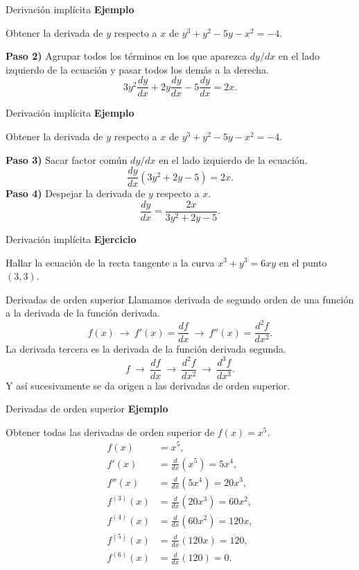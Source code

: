 \documentclass[main.tex]{subfiles}
\begin{document}
\begin{frame}{Derivación implícita}
\textbf{Ejemplo}\par Obtener la derivada de $y$ respecto a $x$ de $y^3+y^2-5y-x^2=-4$.\medskip

\textbf{Paso 2)} Agrupar todos los términos en los que aparezca $dy/dx$ en el lado izquierdo de la ecuación y pasar todos los demás a la derecha.
\[3y^2\frac{dy}{dx}+2y\frac{dy}{dx}-5\frac{dy}{dx}=2x.\]
\end{frame}
\begin{frame}{Derivación implícita}
\textbf{Ejemplo}\par Obtener la derivada de $y$ respecto a $x$ de $y^3+y^2-5y-x^2=-4$.\medskip

\textbf{Paso 3)} Sacar factor común $dy/dx$ en el lado izquierdo de la ecuación.
\[\frac{dy}{dx}(3y^2+2y-5)=2x.\]
\textbf{Paso 4)} Despejar la derivada de $y$ respecto a $x$.
\[\frac{dy}{dx}=\frac{2x}{3y^2+2y-5}.\]
\end{frame}
\begin{frame}{Derivación implícita}
\textbf{Ejercicio}\par\medskip Hallar la ecuación de la recta tangente a la curva $x^3+y^3=6xy$ en el punto $(3,3)$.
\end{frame}
\begin{frame}{Derivadas de orden superior}
Llamamos derivada de segundo orden de una función a la derivada de la función derivada.
\[f(x)\ \longrightarrow\ f'(x)=\frac{df}{dx}\ \longrightarrow\ f''(x)=\frac{d^2f}{dx^2}.\]
La derivada tercera es la derivada de la función derivada segunda.
\[f\ \longrightarrow\ \frac{df}{dx}\ \longrightarrow\ \frac{d^2f}{dx^2}\ \longrightarrow\ \frac{d^3f}{dx^3}.\]
Y así sucesivamente se da origen a las derivadas de orden superior.
\end{frame}
\begin{frame}{Derivadas de orden superior}
\small\textbf{Ejemplo}\par Obtener todas las derivadas de orden superior de $f(x)=x^5$.
\[\begin{aligned}
f(x)&=x^5,\\
f'(x)&=\frac{d}{dx}(x^5)=5x^4,\\
f''(x)&=\frac{d}{dx}(5x^4)=20x^3,\\
f^{(3)}(x)&=\frac{d}{dx}(20x^3)=60x^2,\\
f^{(4)}(x)&=\frac{d}{dx}(60x^2)=120x,\\
f^{(5)}(x)&=\frac{d}{dx}(120x)=120,\\
f^{(6)}(x)&=\frac{d}{dx}(120)=0.
\end{aligned}\]
\end{frame}
\end{document}

